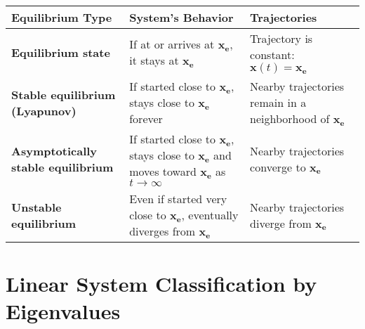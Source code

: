 \begin{table}[h!]
\centering
\renewcommand{\arraystretch}{1.3}
\setlength{\tabcolsep}{8pt}
\begin{tabular}{>{\bfseries}m{3.5cm} m{6cm} m{5cm}}
\textbf{Equilibrium Type} & \textbf{System’s Behavior} & \textbf{Trajectories} \\
\midrule
Equilibrium state &
If at or arrives at $\mathbf{x_e}$, it stays at $\mathbf{x_e}$ &
Trajectory is constant: $\mathbf{x}(t) = \mathbf{x_e}$ \\

Stable equilibrium (Lyapunov) &
If started close to $\mathbf{x_e}$, stays close to $\mathbf{x_e}$ forever &
Nearby trajectories remain in a neighborhood of $\mathbf{x_e}$ \\

Asymptotically stable equilibrium &
If started close to $\mathbf{x_e}$, stays close to $\mathbf{x_e}$ and moves toward $\mathbf{x_e}$ as $t \to \infty$ &
Nearby trajectories converge to $\mathbf{x_e}$ \\

Unstable equilibrium &
Even if started very close to $\mathbf{x_e}$, eventually diverges from $\mathbf{x_e}$ &
Nearby trajectories diverge from $\mathbf{x_e}$ \\
\bottomrule
\end{tabular}
\end{table}


\section*{Linear System Classification by Eigenvalues}





